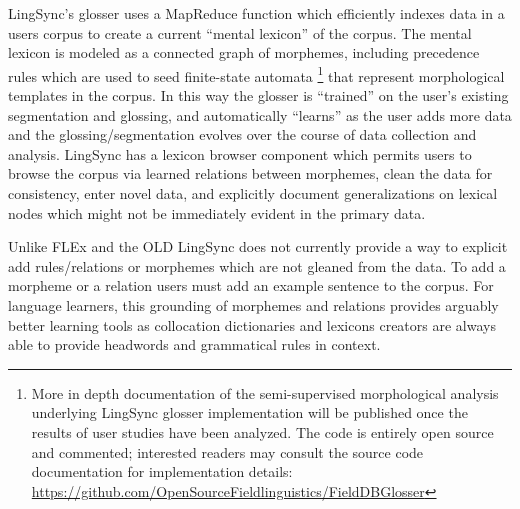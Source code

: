 \documentclass[11pt]{article}
\newcommand{\smalltodo}[2][]
    {\todo[caption={#2}, #1]
    {\tiny#2\normalsize}}
\begin{document}
LingSync's glosser  uses a MapReduce function which efficiently indexes data in
a users corpus to create a current ``mental lexicon'' of the corpus.  The
mental lexicon is modeled as a connected graph of morphemes, including
precedence rules which are used to seed finite-state automata  \cite{Cook:2009}\footnote{More in depth documentation of the semi-supervised morphological analysis  underlying LingSync glosser implementation will be published once the results of user studies have been analyzed. The code is entirely open source and commented; interested readers may consult the source code documentation for implementation details: \\
\url{https://github.com/OpenSourceFieldlinguistics/FieldDBGlosser}}
that represent morphological templates in the corpus. 
In this way the glosser is ``trained'' on the user's existing segmentation and
glossing, and automatically ``learns'' as the user adds more data and the
glossing/segmentation evolves over the course of data collection and analysis. 
LingSync has a lexicon browser component which permits users to browse the
corpus via learned  relations between morphemes, clean the data for
consistency, enter novel data, and explicitly document generalizations on
lexical nodes which might not be immediately evident in the primary data. 

Unlike FLEx \cite{Black:2006} and the OLD LingSync does not currently provide a way to explicit add rules/relations or morphemes which
are not gleaned from the data.  
To add a morpheme or a relation users must add an example sentence to the corpus. 
For language learners, this grounding of morphemes and relations provides arguably better learning
tools as collocation dictionaries and lexicons creators are always able to
provide headwords and grammatical rules in context.%
%
\end{document}
